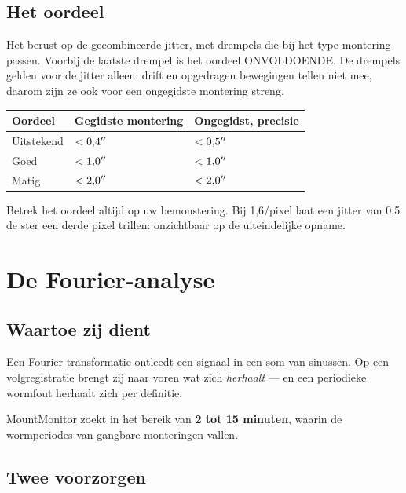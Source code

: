 \section{Het oordeel}

Het berust op de gecombineerde jitter, met drempels die bij het type montering
passen. Voorbij de laatste drempel is het oordeel ONVOLDOENDE. De drempels
gelden voor de jitter alleen: drift en opgedragen bewegingen tellen niet mee,
daarom zijn ze ook voor een ongegidste montering streng.

\begin{center}
\begin{tabularx}{\textwidth}{lXX}
\toprule
\textbf{Oordeel} & \textbf{Gegidste montering} & \textbf{Ongegidst, precisie} \\
\midrule
Uitstekend & $< 0{,}4^{\prime\prime}$ & $< 0{,}5^{\prime\prime}$ \\
Goed       & $< 1{,}0^{\prime\prime}$ & $< 1{,}0^{\prime\prime}$ \\
Matig      & $< 2{,}0^{\prime\prime}$ & $< 2{,}0^{\prime\prime}$ \\
\bottomrule
\end{tabularx}
\end{center}

\begin{tip}
Betrek het oordeel altijd op uw bemonstering. Bij 1,6\arcsec/pixel laat een
jitter van 0,5\arcsec{} de ster een derde pixel trillen: onzichtbaar op de
uiteindelijke opname.
\end{tip}

\chapter{De Fourier-analyse}
\label{ch:fft}

\section{Waartoe zij dient}

Een Fourier-transformatie ontleedt een signaal in een som van sinussen. Op een
volgregistratie brengt zij naar voren wat zich \emph{herhaalt} --- en een
periodieke wormfout herhaalt zich per definitie.

MountMonitor zoekt in het bereik van \textbf{2 tot 15 minuten}, waarin de
wormperiodes van gangbare monteringen vallen.

\section{Twee voorzorgen}

